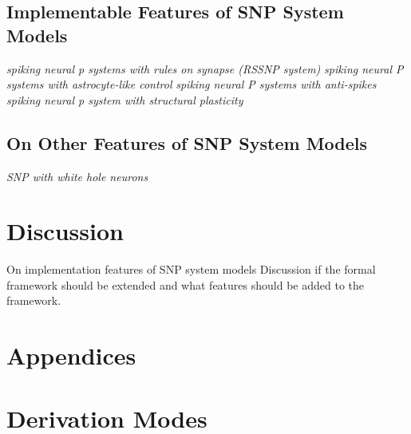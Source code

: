 \documentclass[a4paper]{article}
\theoremstyle{definition}
\begin{document}

\subsection{Implementable Features of SNP System Models}

\emph{spiking neural p systems with rules on synapse (RSSNP system)}
\emph{spiking neural P systems with astrocyte-like control}
\emph{spiking neural P systems with anti-spikes}
\emph{spiking neural p system with structural plasticity}


\subsection{On Other Features of SNP System Models}

\emph{SNP with white hole neurons}



\section{Discussion}

On implementation features of SNP system models
Discussion if the formal framework should be extended and what features should be added
to the framework.


\appendix{}

\section*{Appendices}\label{app}
\section{Derivation Modes}\label{app-derivation}

\cite{freund-2007-ff-1}
\end{document}
